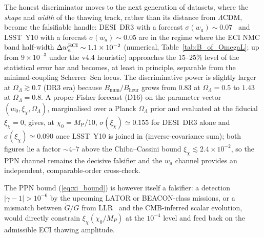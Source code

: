 \begin{enumerate}
  The honest discriminator moves to the next generation of datasets, where the
  \emph{shape} and \emph{width} of the thawing track, rather than its distance from
  $\Lambda$CDM, become the falsifiable handle: DESI~DR3 with a forecast
  $\sigma(w_a)\!\sim\!0.07$~\cite{DESIForecast}
  and LSST~Y10 with a forecast $\sigma(w_a)\!\sim\!0.05$
  are in the regime where the ECI NMC band half-width
  $\Delta w_a^{\rm ECI}\sim 1.1\times 10^{-2}$ (numerical, Table~\ref{tab:B_of_OmegaL};
  up from $9\times 10^{-3}$ under the v4.4 heuristic) approaches the
  $15$--$25\%$ level of the statistical error bar and becomes, at least in principle,
  separable from the minimal-coupling Scherrer--Sen locus. The discriminative
  power is slightly larger at $\Omega_\Lambda\gtrsim 0.7$ (DR3 era) because
  $B_{\mathrm{num}}/B_{\mathrm{heur}}$ grows from $0.83$ at $\Omega_\Lambda=0.5$ to
  $1.43$ at $\Omega_\Lambda=0.8$. A proper Fisher forecast (D16) on the parameter
  vector $(w_0,\xi_\chi,\Omega_\Lambda)$, marginalised over a Planck $\Omega_\Lambda$
  prior and evaluated at the fiducial $\xi_\chi=0$, gives, at $\chi_0=M_\mathrm{P}/10$,
  $\sigma(\xi_\chi)\simeq 0.155$ for DESI~DR3 alone and $\sigma(\xi_\chi)\simeq 0.090$
  once LSST~Y10 is joined in (inverse-covariance sum); both figures lie a factor
  $\sim 4$--$7$ above the Chiba--Cassini bound $\xi_\chi\!\lesssim\!2.4\!\times\!10^{-2}$,
  so the PPN channel remains the decisive falsifier and the $w_a$ channel provides
  an independent, comparable-order cross-check.
\end{enumerate}

The PPN bound (\ref{eq:xi_bound}) is however itself a falsifier: a detection
$|\gamma-1|>10^{-6}$ by the upcoming LATOR or BEACON-class missions, or a mismatch between
$\dot G/G$ from LLR~\cite{Biskupek2021} and the CMB-inferred scalar evolution, would directly
constrain $\xi_\chi(\chi_0/M_P)$ at the $10^{-4}$ level and feed back on the admissible ECI
thawing amplitude.

%   
